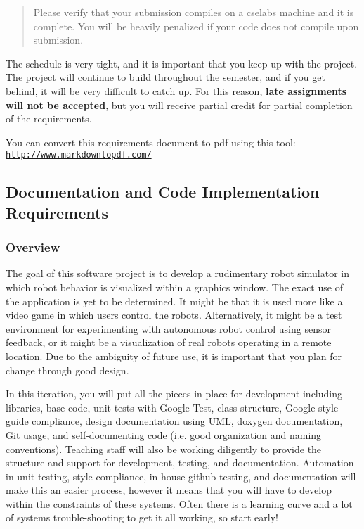 \begin{quote}
Please verify that your submission compiles on a cselabs machine and it is complete. You will be heavily penalized if your code does not compile upon submission. \end{quote}


The schedule is very tight, and it is important that you keep up with the project. The project will continue to build throughout the semester, and if you get behind, it will be very difficult to catch up. For this reason, {\bfseries late assignments will not be accepted}, but you will receive partial credit for partial completion of the requirements.

You can convert this requirements document to pdf using this tool\+: \href{http://www.markdowntopdf.com/}{\tt http\+://www.\+markdowntopdf.\+com/}





\subsection*{Documentation and Code Implementation Requirements}

\subsubsection*{Overview}

The goal of this software project is to develop a rudimentary robot simulator in which robot behavior is visualized within a graphics window. The exact use of the application is yet to be determined. It might be that it is used more like a video game in which users control the robots. Alternatively, it might be a test environment for experimenting with autonomous robot control using sensor feedback, or it might be a visualization of real robots operating in a remote location. Due to the ambiguity of future use, it is important that you plan for change through good design.

In this iteration, you will put all the pieces in place for development including libraries, base code, unit tests with Google Test, class structure, Google style guide compliance, design documentation using U\+ML, doxygen documentation, Git usage, and self-\/documenting code (i.\+e. good organization and naming conventions). Teaching staff will also be working diligently to provide the structure and support for development, testing, and documentation. Automation in unit testing, style compliance, in-\/house github testing, and documentation will make this an easier process, however it means that you will have to develop within the constraints of these systems. Often there is a learning curve and a lot of systems trouble-\/shooting to get it all working, so start early!

